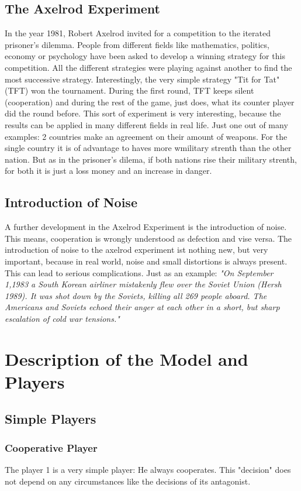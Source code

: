 \documentclass[11pt,twoside]{article}
\begin{document}
\subsection{The Axelrod Experiment}
In the year 1981, Robert Axelrod invited for a competition to the iterated prisoner's dilemma. People from different fields like mathematics, politics, economy or psychology have been asked to develop a winning strategy for this competition. All the different strategies were playing against another to find the most successive strategy. Interestingly, the very simple strategy "Tit for Tat" (TFT) won the tournament. During the first round, TFT keeps silent (cooperation) and during the rest of the game, just does, what its counter player did the round before.
This sort of experiment is very interesting, because the results can be applied in many different fields in real life. Just one out of many examples: 2 countries make an agreement on their amount of weapons. For the single country it is of advantage to haves more wmilitary strenth than the other nation. But as in the prisoner's dilema, if both nations rise their military strenth, for both it is just a loss money and an increase in danger. \cite{axelrod}

\subsection{Introduction of Noise}
A further development in the Axelrod Experiment is the introduction of noise. This means, cooperation is wrongly understood as defection and vise versa. The introduction of noise to the axelrod experiment ist nothing new, but very important, because in real world, noise and small distortions is always present. This can lead to serious complications. Just as an example: \textit{"On September 1,1983 a South Korean airliner mistakenly
flew over the Soviet Union (Hersh 1989). It was shot down by the Soviets, killing all 269
people aboard. The Americans and Soviets echoed their anger at each other in a short,
but sharp escalation of cold war tensions."}\cite{wu}

\section{Description of the Model and Players}

\subsection{Simple Players}
\subsubsection{Cooperative Player}
The player 1 is a very simple player: He always cooperates. This "decision" does not depend on any circumstances like the decisions of its antagonist. 
\end{document}
